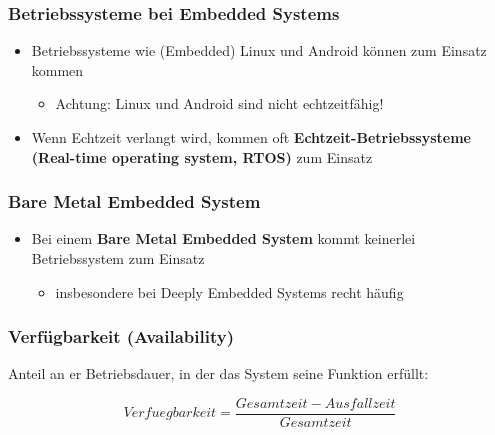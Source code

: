 \subsubsection{Betriebssysteme bei Embedded Systems}
\begin{itemize}
  \item Betriebssysteme wie (Embedded) Linux und Android können zum Einsatz kommen
  \begin{itemize}
    \item Achtung: Linux und Android sind nicht echtzeitfähig!
  \end{itemize}
  \item Wenn Echtzeit verlangt wird, kommen oft \textbf{Echtzeit-Betriebssysteme (Real-time operating system, RTOS)} zum Einsatz
\end{itemize}

\subsubsection{Bare Metal Embedded System}
\begin{itemize}
  \item Bei einem \textbf{Bare Metal Embedded System} kommt keinerlei Betriebssystem zum Einsatz
  \begin{itemize}
    \item insbesondere bei Deeply Embedded Systems recht häufig
  \end{itemize}
\end{itemize}

\subsubsection{Verfügbarkeit (Availability)}
Anteil an er Betriebsdauer, in  der das System seine Funktion
erfüllt:

\begin{equation}
Verfuegbarkeit = \frac{Gesamtzeit-Ausfallzeit}{Gesamtzeit}
\end{equation}

